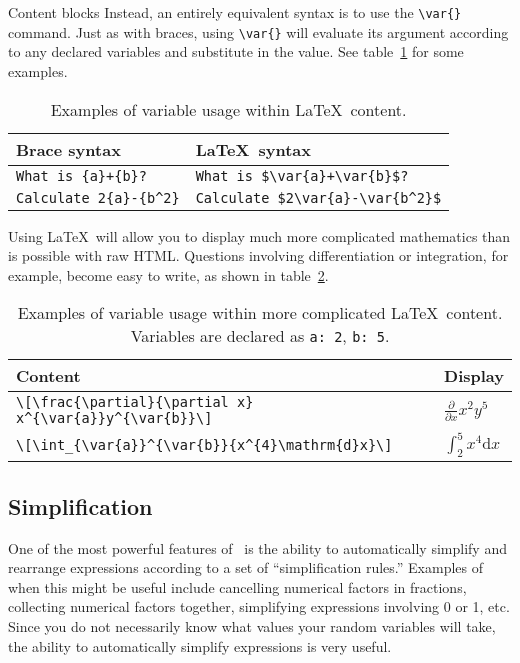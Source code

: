 \begin{chapter}{\label{cha:content_blocks}Content blocks}
  Instead, an entirely equivalent syntax is to use the \verb"\var{}" command.
  Just as with braces, using \verb"\var{}" will evaluate its argument according
  to any declared variables and substitute in the value.  See
  table~\ref{tab:latex_var} for some examples.
  \begin{table}[ht]
    \centering
    \begin{tabular}{ll}
      \hline
      Brace syntax         & \LaTeX\ syntax \\
      \hline
      \verb"What is {a}+{b}?"     & \verb"What is $\var{a}+\var{b}$?" \\
      \verb"Calculate 2{a}-{b^2}" & \verb"Calculate $2\var{a}-\var{b^2}$" \\
      \hline\hline
    \end{tabular}
    \caption{\label{tab:latex_var}
      Examples of variable usage within \LaTeX\ content.
    }
  \end{table}

  Using \LaTeX\ will allow you to display much more complicated mathematics
  than is possible with raw HTML.  Questions involving differentiation or
  integration, for example, become easy to write, as shown in
  table~\ref{tab:more_complicated_latex}.
  \begin{table}[ht]
    \centering
    \begin{tabular}{ll}
      \hline
      Content & Display \\
      \hline
      \rule{0em}{5ex}\verb"\[\frac{\partial}{\partial x} x^{\var{a}}y^{\var{b}}\]" & $\displaystyle{\frac{\partial}{\partial x} x^{2}y^{5}}$ \\[2ex]
      \rule{0em}{5ex}\verb"\[\int_{\var{a}}^{\var{b}}{x^{4}\mathrm{d}x}\]" &
      $\displaystyle{\int_{2}^{5}{x^{4}\mathrm{d}x}}$ \\[2ex]
      \hline\hline
    \end{tabular}
    \caption{\label{tab:more_complicated_latex}
      Examples of variable usage within more complicated \LaTeX\ content.
      Variables are declared as \texttt{a: 2}, \texttt{b: 5}.
    }
  \end{table}

  \subsection{\label{sec:simplification}Simplification}
  One of the most powerful features of \numbas\ is the ability to
  automatically simplify and rearrange expressions according to a set of
  ``simplification rules.''  Examples of when this might be useful include
  cancelling numerical factors in fractions, collecting numerical factors
  together, simplifying expressions involving 0 or 1, etc.  Since you do not
  necessarily know what values your random variables will take, the ability to
  automatically simplify expressions is very useful.


\end{chapter}
